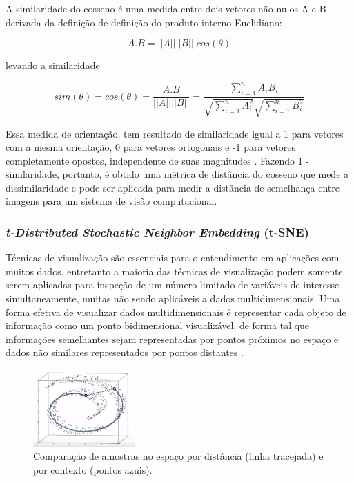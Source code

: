 \documentclass[12pt]{report}
\begin{document}
A similaridade do cosseno é uma medida entre dois vetores não nulos A e B derivada da definição de definição do produto interno Euclidiano:

\begin{equation}
    A.B = ||A|| ||B||.\textit{cos}(\theta)
\end{equation}

levando a similaridade

\begin{equation}
    sim(\theta) = \textit{cos}(\theta) = \frac{A.B}{||A|| ||B||} = \frac{\sum_{i=1}^{n}A_iB_i}{\sqrt{\sum_{i=1}^{n}A_i^2}\sqrt{\sum_{i=1}^{n}B_i^2}}
\end{equation}

Essa medida de orientação, tem resultado de similaridade igual a 1 para vetores com a mesma orientação, 0 para vetores ortogonais e -1 para vetores completamente opostos, independente de suas magnitudes \cite{cosine}. Fazendo 1 - similaridade, portanto, é obtido uma métrica de distância do cosseno que mede a dissimilaridade e pode ser aplicada para medir a distância de semelhança entre imagens para um sistema de visão computacional.

\subsubsection{\textit{t-Distributed Stochastic Neighbor Embedding} (\ac{t-SNE})}

Técnicas de visualização são essenciais para o entendimento em aplicações com muitos dados, entretanto a maioria das técnicas de visualização podem somente serem aplicadas para inspeção de um número limitado de variáveis de interesse simultaneamente, muitas não sendo aplicáveis a dados multidimensionais. Uma forma efetiva de visualizar dados multidimensionais é representar cada objeto de informação como um ponto bidimensional visualizável, de forma tal que informações semelhantes sejam representadas por pontos próximos no espaço e dados não similares representados por pontos distantes \cite{techtalk}.

\begin{figure}
    \centering
    \includegraphics[width=0.35\textwidth]{images/pca.png}
    \caption{Comparação de amostras no espaço por distância (linha tracejada) e por contexto (pontos azuis).}
    \label{fig:pcaxtsne}
\end{figure}
\end{document}
